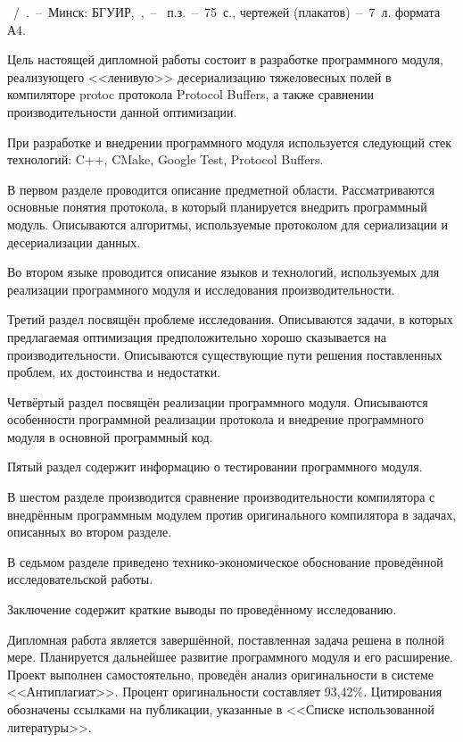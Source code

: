 
\noindent\MakeUppercase{\taskNameFull}~/~\studentShort.~--~Минск: БГУИР,~\targetYear,~--~ п.з.~--~75~с., чертежей (плакатов)~--~7~л. формата А4.

Цель настоящей дипломной работы состоит в разработке программного модуля, реализующего <<ленивую>> десериализацию тяжеловесных
полей в компиляторе protoc протокола Protocol Buffers, а также сравнении производительности данной оптимизации.

При разработке и внедрении программного модуля используется следующий стек технологий: C++, CMake, Google Test, Protocol Buffers.

В первом разделе проводится описание предметной области. Рассматриваются основные понятия протокола, в который планируется
внедрить программный модуль. Описываются алгоритмы, используемые протоколом для сериализации и десериализации данных.

Во втором языке проводится описание языков и технологий, используемых для реализации 
программного модуля и исследования производительности.

Третий раздел посвящён проблеме исследования. Описываются задачи, в которых
предлагаемая оптимизация предположительно хорошо сказывается на производительности.
Описываются существующие пути решения поставленных проблем, их достоинства и недостатки.

Четвёртый раздел посвящён реализации программного модуля. Описываются особенности программной реализации
протокола и внедрение программного модуля в основной программный код.

Пятый раздел содержит информацию о тестировании программного модуля.

В шестом разделе производится сравнение производительности компилятора с внедрённым программным модулем против оригинального компилятора в задачах, описанных во втором разделе.

В седьмом разделе приведено технико-экономическое обоснование проведённой исследовательской работы.

Заключение содержит краткие выводы по проведённому исследованию.

Дипломная работа является завершённой, поставленная задача решена
в полной мере. Планируется дальнейшее развитие программного модуля и его расширение. 
Проект выполнен самостоятельно, проведён анализ оригинальности в системе <<Антиплагиат>>. 
Процент оригинальности составляет 93,42\%. 
Цитирования обозначены ссылками на публикации, указанные в <<Списке использованной литературы>>.

\thispagestyle{empty}

\clearpage
